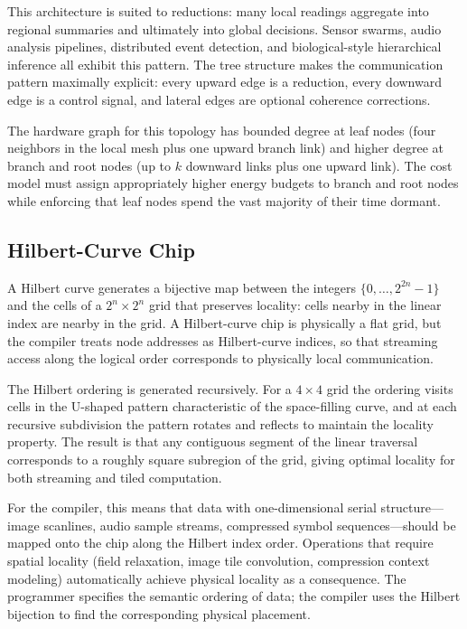 \documentclass[11pt, a4paper]{article}
\begin{document}
This architecture is suited to reductions: many local readings aggregate into regional
summaries and ultimately into global decisions. Sensor swarms, audio analysis
pipelines, distributed event detection, and biological-style hierarchical inference all
exhibit this pattern. The tree structure makes the communication pattern maximally
explicit: every upward edge is a reduction, every downward edge is a control signal,
and lateral edges are optional coherence corrections.

The hardware graph for this topology has bounded degree at leaf nodes (four neighbors
in the local mesh plus one upward branch link) and higher degree at branch and root
nodes (up to $k$ downward links plus one upward link). The cost model must assign
appropriately higher energy budgets to branch and root nodes while enforcing that
leaf nodes spend the vast majority of their time dormant.

\subsection{Hilbert-Curve Chip}

A Hilbert curve generates a bijective map between the integers $\{0, \ldots, 2^{2n}-1\}$
and the cells of a $2^n \times 2^n$ grid that preserves locality: cells nearby in the
linear index are nearby in the grid. A Hilbert-curve chip is physically a flat grid,
but the compiler treats node addresses as Hilbert-curve indices, so that streaming
access along the logical order corresponds to physically local communication.

The Hilbert ordering is generated recursively. For a $4 \times 4$ grid the ordering
visits cells in the U-shaped pattern characteristic of the space-filling curve, and
at each recursive subdivision the pattern rotates and reflects to maintain the
locality property. The result is that any contiguous segment of the linear traversal
corresponds to a roughly square subregion of the grid, giving optimal locality for
both streaming and tiled computation.

For the compiler, this means that data with one-dimensional serial structure---
image scanlines, audio sample streams, compressed symbol sequences---should be
mapped onto the chip along the Hilbert index order. Operations that require spatial
locality (field relaxation, image tile convolution, compression context modeling)
automatically achieve physical locality as a consequence. The programmer specifies
the semantic ordering of data; the compiler uses the Hilbert bijection to find the
corresponding physical placement.
\end{document}
